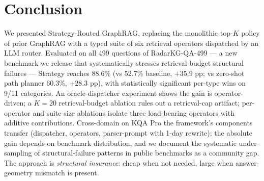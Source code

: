 \documentclass[10pt,a4paper,twocolumn]{article}
\begin{document}
\section{Conclusion}
\label{sec:conclusion}

We presented Strategy-Routed GraphRAG, replacing the monolithic top-$K$ policy of prior GraphRAG with a typed suite of six retrieval operators dispatched by an LLM router. Evaluated on all 499 questions of RadarKG-QA-499 --- a new benchmark we release that systematically stresses retrieval-budget structural failures --- Strategy reaches 88.6\% (vs 52.7\% baseline, $+35.9$ pp; vs zero-shot path planner 60.3\%, $+28.3$ pp), with statistically significant per-type wins on 9/11 categories. An oracle-dispatcher experiment shows the gain is operator-driven; a $K\!=\!20$ retrieval-budget ablation rules out a retrieval-cap artifact; per-operator and suite-size ablations isolate three load-bearing operators with additive contributions. Cross-domain on KQA Pro the framework's components transfer (dispatcher, operators, parser-prompt with 1-day rewrite); the absolute gain depends on benchmark distribution, and we document the systematic under-sampling of structural-failure patterns in public benchmarks as a community gap. The approach is \emph{structural insurance}: cheap when not needed, large when answer-geometry mismatch is present.




\end{document}
